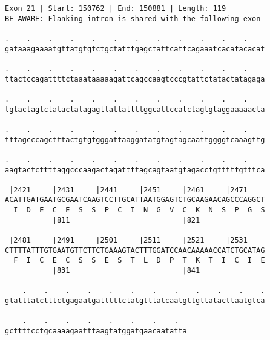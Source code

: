 \documentclass{article}
\begin{document}
\begin{Verbatim}
Exon 21 | Start: 150762 | End: 150881 | Length: 119
BE AWARE: Flanking intron is shared with the following exon
 
.    .    .    .    .    .    .    .    .    .    .    .    
gataaagaaaatgttatgtgtctgctatttgagctattcattcagaaatcacatacacat
  
.    .    .    .    .    .    .    .    .    .    .    .    
ttactccagattttctaaataaaaagattcagccaagtcccgtattctatactatagaga
  
.    .    .    .    .    .    .    .    .    .    .    .    
tgtactagtctatactatagagttattattttggcattccatctagtgtaggaaaaacta
  
.    .    .    .    .    .    .    .    .    .    .    .    
tttagcccagctttactgtgtgggattaaggatatgtagtagcaattggggtcaaagttg
  
.    .    .    .    .    .    .    .    .    .    .    .    
aagtactcttttaggcccaagactagattttagcagtaatgtagacctgtttttgtttca
  
 |2421     |2431     |2441     |2451     |2461     |2471    
ACATTGATGAATGCGAATCAAGTCCTTGCATTAATGGAGTCTGCAAGAACAGCCCAGGCT
  I  D  E  C  E  S  S  P  C  I  N  G  V  C  K  N  S  P  G  S
           |811                          |821               
  
 |2481     |2491     |2501     |2511     |2521     |2531    
CTTTTATTTGTGAATGTTCTTCTGAAAGTACTTTGGATCCAACAAAAACCATCTGCATAG
  F  I  C  E  C  S  S  E  S  T  L  D  P  T  K  T  I  C  I  E
           |831                          |841               
  
    .    .    .    .    .    .    .    .    .    .    .    .
gtatttatctttctgagaatgatttttctatgtttatcaatgttgttatacttaatgtca
  
    .    .    .    .    .    .    .    .  
gcttttcctgcaaaagaatttaagtatggatgaacaatatta
\end{Verbatim}
\newpage
\end{document}
